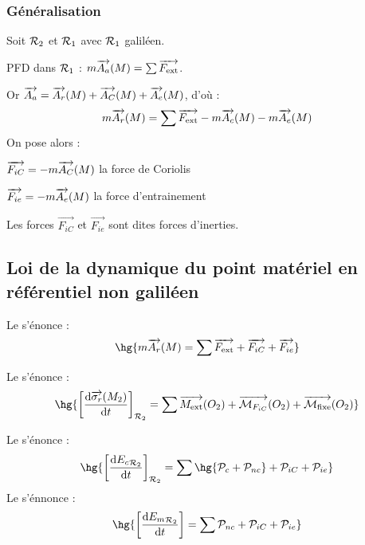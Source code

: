 \documentclass[a4paper,french,bookmarks]{book}
\begin{document}
    \subsubsection{Généralisation}
    
    Soit $\mathcal{R}_2$ et $\mathcal{R}_1$ avec $\mathcal{R}_1$ galiléen.
    
    PFD dans $\mathcal{R}_1$ : $m\overrightarrow{A_a}\!\left(M\right) = \sum \overrightarrow{F_\text{ext}}$.
    
    Or $\overrightarrow{A_a} = \overrightarrow{A_r}\!\left(M\right) + \overrightarrow{A_C}\!\left(M\right) + \overrightarrow{A_e}\!\left(M\right)$, d'où :
    \[ m\overrightarrow{A_r}\!\left(M\right) = \sum \overrightarrow{F_\text{ext}} - m\overrightarrow{A_c}\!\left(M\right) - m\overrightarrow{A_e}\!\left(M\right)\]
    On pose alors :
    \begin{enumerate}
        \itt $\overrightarrow{F_{iC}} = -m\overrightarrow{A_C}\!\left(M\right)$ la force de \textsf{Coriolis}
        
        \itt $\overrightarrow{F_{ie}} = -m\overrightarrow{A_e}\!\left(M\right)$ la force d'entrainement
        
        \itt Les forces $\vec{F_{iC}}$ et $\vec{F_{ie}}$ sont dites forces d'inerties.
    \end{enumerate}
    
    \subsection{Loi de la dynamique du point matériel en référentiel non galiléen}
    
    \begin{form}{}{}
        \begin{enumerate}
            \itt Le  s'énonce :
            \[ \hg{m\vec{A_r}\p{M} = \sum \vec{F_\text{ext}} + \vec{F_{iC}} + \vec{F_{ie}}}\]
            
            \itt Le  s'énonce :
            \[ \hg{\intc{\dfrac{\dif \vec{\sigma_r}\p{M_2}}{\dif t}}_{\bcR_2} = \sum \vec{M_\text{ext}}\p{O_2} + \vec{\bcM_{F_{iC}}}\p{O_2} + \vec{\bcM_\text{fixe}}\p{O_2}} \]
            
            \itt Le  s'énonce :
            \[ \hg{\intc{\dfrac{\dif {E_c}_{\bcR_2}}{\dif t}}_{\bcR_2} = \sum \hg{\bcP_{c} + \bcP_{nc}} + \bcP_{iC} + \bcP_{ie}}\]
            \itt Le  s'énnonce :
            \[ \hg{\intc{\dfrac{\dif {E_m}_{\bcR_2}}{\dif t}} = \sum \bcP_{nc} + \bcP_{iC} + \bcP_{ie}}\]
        \end{enumerate}
    \end{form}
    
\end{document}
